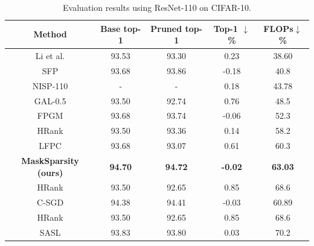 \documentclass[review]{cvpr}
\begin{document}
\begin{table}[ht]
	\large\caption{Evaluation results using ResNet-110 on CIFAR-10.}
	\vspace{-0.4cm}
	\small
	\setlength{\tabcolsep}{0.01em}
	\begin{center}
		\begin{tabular}{ccccc}
			\hline
			
			Method 							&Base top-1		&Pruned top-1	& Top-1 $\downarrow$\% 	&FLOPs$\downarrow$\%	 			\\
			\hline
			
			
			Li et al. \cite{li2016pruning}		    &	93.53	&	93.30	&	0.23 		&	38.60	    \\
			SFP \cite{he2018soft}					&	93.68	&	93.86	&	-0.18	    &	40.8	    \\
			NISP-110 \cite{yu2018nisp}				&	-		&	-		&	0.18		&	43.78		\\
			GAL-0.5 \cite{GAL}						&	93.50	&	92.74	&	0.76		&	48.5		\\
			
			FPGM \cite{FPGM}		&93.68	&93.74	&	-0.06	&	52.3\\

			
			
			HRank \cite{HRank}						&	93.50	&	93.36	&	0.14		&	58.2		\\
			
			LFPC \cite{he2020learning}				&	93.68	&	93.07	&	0.61	    &	60.3	    \\
			\textbf{MaskSparsity (ours)}	&	\textbf{94.70}	&	\textbf{94.72}	&	\textbf{-0.02}	&	\textbf{63.03}\\
			HRank \cite{HRank}		&	93.50	&	92.65	&      0.85		&	68.6		\\
		
		
		   	C-SGD \cite{CSGD}						&	94.38	&	94.41	&	-0.03		&	60.89		\\
		    HRank									&	93.50	&	92.65	&	0.85		&	68.6		\\
		    
		    SASL \cite{SASL}						&	93.83	&	93.80	&	0.03		&	70.2		\\
		 
			
			\hline
			
		\end{tabular}
	\end{center}
	\label{exp-table-cifar10-r110}
\end{table}
 
\end{document}
